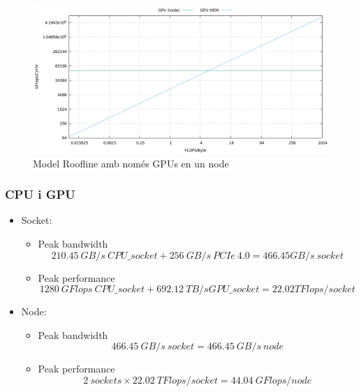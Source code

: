 \begin{figure}[H]
    \centering
    \includegraphics[width=\textwidth]{entregable/img/roofline_gpun_memgpu}
    \caption{Model Roofline amb només GPUs en un node}
    \label{fig:summary}
\end{figure}

\subsubsection{CPU i GPU}
\begin{itemize}
    \item Socket:
        \begin{itemize}
            \item Peak bandwidth
                \[210.45\ GB/s\ CPU\_socket + 256\ GB/s\ PCIe\ 4.0 = 466.45 GB/s\ socket\]
            \item Peak performance
                \[ 1280\ GFlops\ CPU\_socket + 692.12\ TB/s GPU\_socket = 22.02 TFlops/socket\]
        \end{itemize}
    \item Node:
        \begin{itemize}
            \item Peak bandwidth
                \[466.45\ GB/s\ socket = 466.45\ GB/s\ node\]
            \item Peak performance
\[2\ sockets \times 22.02\ TFlops/socket = 44.04\ GFlops/node\]
        \end{itemize}
\end{itemize}

